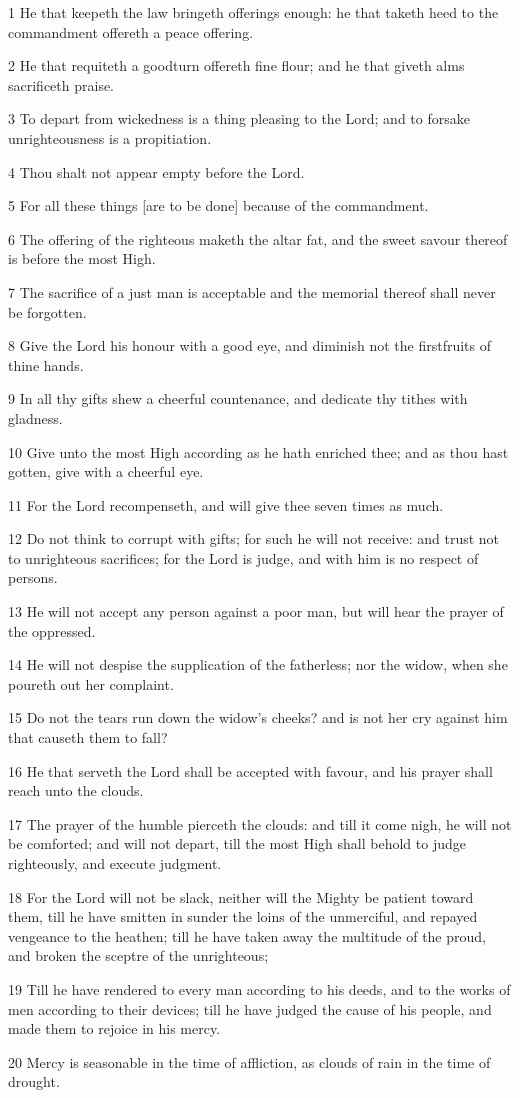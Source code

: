 \par 1 He that keepeth the law bringeth offerings enough: he that taketh heed to the commandment offereth a peace offering.
\par 2 He that requiteth a goodturn offereth fine flour; and he that giveth alms sacrificeth praise.
\par 3 To depart from wickedness is a thing pleasing to the Lord; and to forsake unrighteousness is a propitiation.
\par 4 Thou shalt not appear empty before the Lord.
\par 5 For all these things [are to be done] because of the commandment.
\par 6 The offering of the righteous maketh the altar fat, and the sweet savour thereof is before the most High.
\par 7 The sacrifice of a just man is acceptable and the memorial thereof shall never be forgotten.
\par 8 Give the Lord his honour with a good eye, and diminish not the firstfruits of thine hands.
\par 9 In all thy gifts shew a cheerful countenance, and dedicate thy tithes with gladness.
\par 10 Give unto the most High according as he hath enriched thee; and as thou hast gotten, give with a cheerful eye.
\par 11 For the Lord recompenseth, and will give thee seven times as much.
\par 12 Do not think to corrupt with gifts; for such he will not receive: and trust not to unrighteous sacrifices; for the Lord is judge, and with him is no respect of persons.
\par 13 He will not accept any person against a poor man, but will hear the prayer of the oppressed.
\par 14 He will not despise the supplication of the fatherless; nor the widow, when she poureth out her complaint.
\par 15 Do not the tears run down the widow's cheeks? and is not her cry against him that causeth them to fall?
\par 16 He that serveth the Lord shall be accepted with favour, and his prayer shall reach unto the clouds.
\par 17 The prayer of the humble pierceth the clouds: and till it come nigh, he will not be comforted; and will not depart, till the most High shall behold to judge righteously, and execute judgment.
\par 18 For the Lord will not be slack, neither will the Mighty be patient toward them, till he have smitten in sunder the loins of the unmerciful, and repayed vengeance to the heathen; till he have taken away the multitude of the proud, and broken the sceptre of the unrighteous;
\par 19 Till he have rendered to every man according to his deeds, and to the works of men according to their devices; till he have judged the cause of his people, and made them to rejoice in his mercy.
\par 20 Mercy is seasonable in the time of affliction, as clouds of rain in the time of drought.

